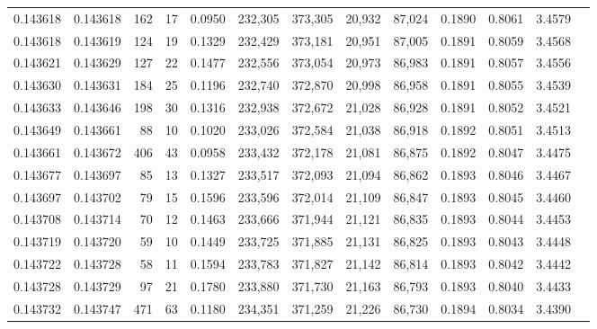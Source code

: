 \begin{tabular}{rrrrrrrrrrrrr}
0.143618 & 0.143618 &   162 &  17 &                                     0.0950 & 232,305 & 373,305 &  20,932 &  87,024 & 0.1890 & 0.8061 & 3.4579 \\
0.143618 & 0.143619 &   124 &  19 &                                     0.1329 & 232,429 & 373,181 &  20,951 &  87,005 & 0.1891 & 0.8059 & 3.4568 \\
0.143621 & 0.143629 &   127 &  22 &                                     0.1477 & 232,556 & 373,054 &  20,973 &  86,983 & 0.1891 & 0.8057 & 3.4556 \\
0.143630 & 0.143631 &   184 &  25 &                                     0.1196 & 232,740 & 372,870 &  20,998 &  86,958 & 0.1891 & 0.8055 & 3.4539 \\
0.143633 & 0.143646 &   198 &  30 &                                     0.1316 & 232,938 & 372,672 &  21,028 &  86,928 & 0.1891 & 0.8052 & 3.4521 \\
0.143649 & 0.143661 &    88 &  10 &                                     0.1020 & 233,026 & 372,584 &  21,038 &  86,918 & 0.1892 & 0.8051 & 3.4513 \\
0.143661 & 0.143672 &   406 &  43 &                                     0.0958 & 233,432 & 372,178 &  21,081 &  86,875 & 0.1892 & 0.8047 & 3.4475 \\
0.143677 & 0.143697 &    85 &  13 &                                     0.1327 & 233,517 & 372,093 &  21,094 &  86,862 & 0.1893 & 0.8046 & 3.4467 \\
0.143697 & 0.143702 &    79 &  15 &                                     0.1596 & 233,596 & 372,014 &  21,109 &  86,847 & 0.1893 & 0.8045 & 3.4460 \\
0.143708 & 0.143714 &    70 &  12 &                                     0.1463 & 233,666 & 371,944 &  21,121 &  86,835 & 0.1893 & 0.8044 & 3.4453 \\
0.143719 & 0.143720 &    59 &  10 &                                     0.1449 & 233,725 & 371,885 &  21,131 &  86,825 & 0.1893 & 0.8043 & 3.4448 \\
0.143722 & 0.143728 &    58 &  11 &                                     0.1594 & 233,783 & 371,827 &  21,142 &  86,814 & 0.1893 & 0.8042 & 3.4442 \\
0.143728 & 0.143729 &    97 &  21 &                                     0.1780 & 233,880 & 371,730 &  21,163 &  86,793 & 0.1893 & 0.8040 & 3.4433 \\
0.143732 & 0.143747 &   471 &  63 &                                     0.1180 & 234,351 & 371,259 &  21,226 &  86,730 & 0.1894 & 0.8034 & 3.4390 \\

\end{tabular}
